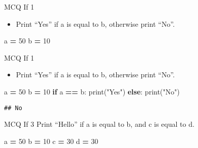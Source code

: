\documentclass[
  8pt,
  ignorenonframetext,
]{beamer}
\newenvironment{Shaded}{\begin{snugshade}}{\end{snugshade}}
\newcommand{\BuiltInTok}[1]{#1}
\newcommand{\ControlFlowTok}[1]{\textcolor[rgb]{0.13,0.29,0.53}{\textbf{#1}}}
\newcommand{\DecValTok}[1]{\textcolor[rgb]{0.00,0.00,0.81}{#1}}
\newcommand{\NormalTok}[1]{#1}
\newcommand{\OperatorTok}[1]{\textcolor[rgb]{0.81,0.36,0.00}{\textbf{#1}}}
\newcommand{\StringTok}[1]{\textcolor[rgb]{0.31,0.60,0.02}{#1}}
\providecommand{\tightlist}{%
  \setlength{\itemsep}{0pt}\setlength{\parskip}{0pt}}
\begin{document}
\begin{frame}[fragile]{MCQ If 1}
\protect\hypertarget{mcq-if-1}{}
\begin{itemize}
\tightlist
\item
  Print ``Yes'' if a is equal to b, otherwise print ``No''.
\end{itemize}

\begin{Shaded}
\begin{Highlighting}[]
\NormalTok{a }\OperatorTok{=} \DecValTok{50}
\NormalTok{b }\OperatorTok{=} \DecValTok{10}
\end{Highlighting}
\end{Shaded}
\end{frame}

\begin{frame}[fragile]{MCQ If 1}
\protect\hypertarget{mcq-if-1-1}{}
\begin{itemize}
\tightlist
\item
  Print ``Yes'' if a is equal to b, otherwise print ``No''.
\end{itemize}

\begin{Shaded}
\begin{Highlighting}[]
\NormalTok{a }\OperatorTok{=} \DecValTok{50}
\NormalTok{b }\OperatorTok{=} \DecValTok{10}
\ControlFlowTok{if}\NormalTok{ a }\OperatorTok{==}\NormalTok{ b:}
  \BuiltInTok{print}\NormalTok{(}\StringTok{"Yes"}\NormalTok{)}
\ControlFlowTok{else}\NormalTok{:}
  \BuiltInTok{print}\NormalTok{(}\StringTok{"No"}\NormalTok{)}
\end{Highlighting}
\end{Shaded}

\begin{verbatim}
## No
\end{verbatim}
\end{frame}

\begin{frame}[fragile]{MCQ If 3}
\protect\hypertarget{mcq-if-3}{}
Print ``Hello'' if a is equal to b, and c is equal to d.

\begin{Shaded}
\begin{Highlighting}[]
\NormalTok{a }\OperatorTok{=} \DecValTok{50}
\NormalTok{b }\OperatorTok{=} \DecValTok{10}
\NormalTok{c }\OperatorTok{=} \DecValTok{30}
\NormalTok{d }\OperatorTok{=} \DecValTok{30}
\end{Highlighting}
\end{Shaded}
\end{frame}
\end{document}
